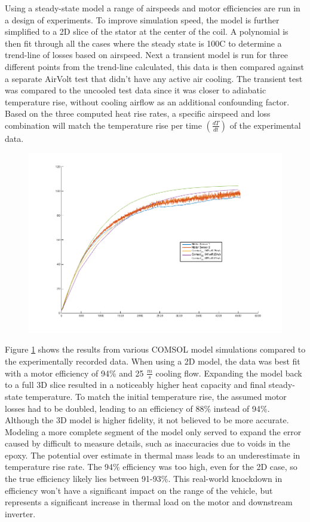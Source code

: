 \documentclass[]{aiaa-tc}%
\begin{document}
Using a steady-state model a range of airspeeds and motor efficiencies are run in a design of experiments. To improve simulation speed, the model is further simplified to a 2D slice of the stator at the center of the coil. A polynomial is then fit through all the cases where the steady state is 100C to determine a trend-line of losses based on airspeed.
Next a transient model is run for three different points from the trend-line calculated, this data is then compared against a separate AirVolt test that didn't have any active air cooling. The transient test was compared to the uncooled test data since it was closer to adiabatic temperature rise, without cooling airflow as an additional confounding factor. Based on the three computed heat rise rates, a specific airspeed and loss combination will match the temperature rise per time $(\frac{dT}{dt})$ of the experimental data.

\begin{figure}[!h]%
	\centering
	\includegraphics[width=1.0\textwidth]{figures/Temp_motor_1012_0929.png}
	\caption{}
	\label{fig:COMSOLresults}
\end{figure}

Figure \ref{fig:COMSOLresults} shows the results from various COMSOL model simulations compared to the experimentally recorded data. When using a 2D model, the data was best fit with a motor efficiency of 94\% and 25 $\frac{m}{s}$ cooling flow. Expanding the model back to a full 3D slice resulted in a noticeably higher heat capacity and final steady-state temperature. To match the initial temperature rise, the assumed motor losses had to be doubled, leading to an efficiency of 88\% instead of 94\%. Although the 3D model is higher fidelity, it not believed to be more accurate. Modeling a more complete segment of the model only served to expand the error caused by difficult to measure details, such as inaccuracies due to voids in the epoxy. The potential over estimate in thermal mass leads to an underestimate in temperature rise rate. The 94\% efficiency was too high, even for the 2D case, so the true efficiency likely lies between 91-93\%. This real-world knockdown in efficiency won't have a significant impact on the range of the vehicle, but represents a significant increase in thermal load on the motor and downstream inverter.
\end{document}
